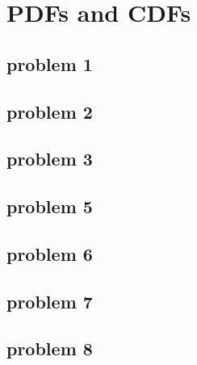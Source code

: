\section{PDFs and CDFs}

\subsection{problem 1}

\subsection{problem 2}

\subsection{problem 3}

\subsection{problem 5}

\subsection{problem 6}

\subsection{problem 7}

\subsection{problem 8}

